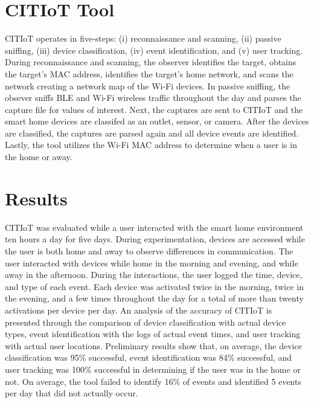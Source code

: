 \documentclass[12pt,letterpaper,oneside]{book}
\begin{document}
\tableBtleDevices

\section{\acf{CITIoT} Tool}

CITIoT operates in five-steps: (i) reconnaissance and scanning, (ii) passive sniffing, (iii) device classification, (iv) event identification, and (v) user tracking. During reconnaissance and scanning, the observer identifies the target, obtains the target's \ac{MAC} address, identifies the target's home network, and scans the network creating a network map of the Wi-Fi devices. In passive sniffing, the obsever sniffs \ac{BLE} and Wi-Fi wireless traffic throughout the day and parses the capture file for values of interest. Next, the captures are sent to \ac{CITIoT} and the smart home devices are classifed as an outlet, sensor, or camera. After the devices are classified, the captures are parsed again and all device events are identified. Lastly, the tool utilizes the Wi-Fi \ac{MAC} address to determine when a user is in the home or away. 

\section{Results}

\ac{CITIoT} was evaluated while a user interacted with the smart home environment ten hours a day for five days. During experimentation, devices are accessed while the user is both home and away to observe differences in communication. The user interacted with devices while home in the morning and evening, and while away in the afternoon. During the interactions, the user logged the time, device, and type of each event. Each device was activated twice in the morning, twice in the evening, and a few times throughout the day for a total of more than twenty activations per device per day. An analysis of the accuracy of \ac{CITIoT} is presented through the comparison of device classification with actual device types, event identification with the logs of actual event times, and user tracking with actual user locations. Preliminary results show that, on average, the device classification was 95\% successful, event identification was 84\% successful, and user tracking was 100\% successful in determining if the user was in the home or not. On average, the tool failed to identify 16\% of events and identified 5 events per day that did not actually occur.

\begin{flushleft}
	\singlespace
	
	 
	\clearpage
\end{flushleft}
\end{document}
